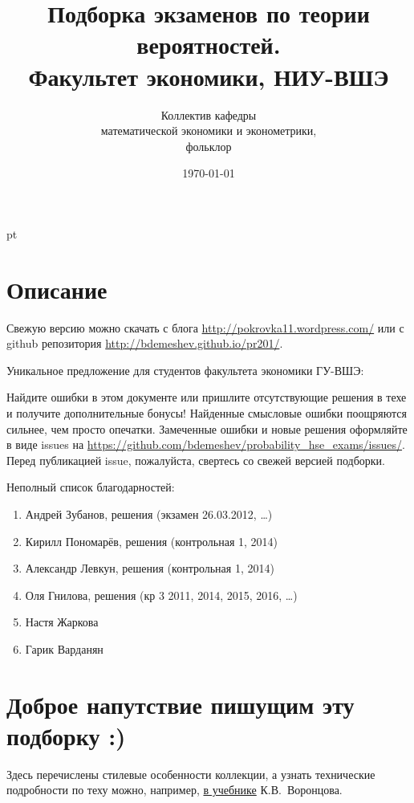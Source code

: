 \documentclass[12pt, a4paper]{article}
\title{Подборка экзаменов по теории вероятностей. \\Факультет экономики, НИУ-ВШЭ}
\date{\today}
\author{Коллектив кафедры \\
математической экономики и эконометрики,\\
 фольклор}
\begin{document}
\maketitle

\tableofcontents{}


 pt %

\section{Описание}

Свежую версию можно скачать с блога \url{http://pokrovka11.wordpress.com/} или с github репозитория \url{http://bdemeshev.github.io/pr201/}.


Уникальное предложение для студентов факультета экономики ГУ-ВШЭ:


Найдите ошибки в этом документе или пришлите отсутствующие решения в техе и получите дополнительные бонусы! Найденные смысловые ошибки поощряются сильнее, чем просто опечатки. Замеченные ошибки и новые решения оформляйте в виде issues на \url{https://github.com/bdemeshev/probability_hse_exams/issues/}. Перед публикацией issue, пожалуйста, свертесь со свежей версией подборки.

Неполный список благодарностей:

\begin{enumerate}
\item Андрей Зубанов, решения (экзамен 26.03.2012, \ldots)
\item Кирилл Пономарёв, решения (контрольная 1, 2014)
\item Александр Левкун, решения (контрольная 1, 2014)
\item Оля Гнилова, решения (кр 3 2011, 2014, 2015, 2016, \ldots)
\item Настя Жаркова
\item Гарик Варданян
\end{enumerate}


\section{Доброе напутствие пишущим эту подборку :)}

Здесь перечислены стилевые особенности коллекции, а узнать технические подробности по теху можно, например, \href{http://www.ccas.ru/voron/download/voron05latex.pdf}{в учебнике} К.В. Воронцова.
\end{document}
